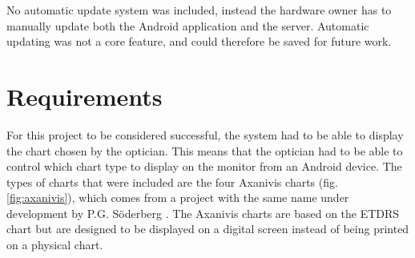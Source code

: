 \documentclass[12pt,a4paper,notitlepage]{report}
\begin{document}
No automatic update system was included, instead the hardware owner has to manually update both the Android application and the server. Automatic updating was not a core feature, and could therefore be saved for future work.

\section{ Requirements}%
For this project to be considered successful, the system had to be able to display the chart chosen by the optician. This means that the optician had to be able to control which chart type to display on the monitor from an Android device. The types of charts that were included are the four Axanivis charts (fig. \ref{fig:axanivis}), which comes from a project with the same name under development by P.G. Söderberg \cite{PGSoderbergOral}. The Axanivis charts are based on the ETDRS chart but are designed to be displayed on a digital screen instead of being printed on a physical chart. 
\end{document}
